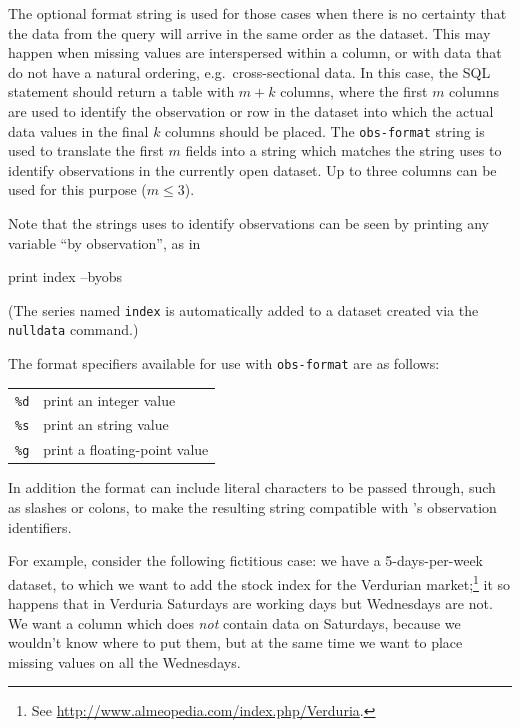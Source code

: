 The optional format string is used for those cases when there is no
certainty that the data from the query will arrive in the same order
as the  dataset. This may happen when missing values are
interspersed within a column, or with data that do not have a natural
ordering, e.g.\ cross-sectional data. In this case, the SQL statement
should return a table with $m+k$ columns, where the first $m$
columns are used to identify the observation or row in the 
dataset into which the actual data values in the final $k$ columns
should be placed.  The \texttt{obs-format} string is used to translate
the first $m$ fields into a string which matches the string
 uses to identify observations in the currently open
dataset. Up to three columns can be used for this purpose ($m \leq
3$).

Note that the strings  uses to identify observations
can be seen by printing any variable ``by observation'', as in
%
\begin{code}
print index --byobs
\end{code}
%
(The series named \texttt{index} is automatically added to a dataset
created via the \texttt{nulldata} command.)

The format specifiers available for use with \texttt{obs-format} are
as follows:

\begin{center}
\begin{tabular}{ll}
\texttt{\%d} & print an integer value \\
\texttt{\%s} & print an string value \\
\texttt{\%g} & print a floating-point value \\
\end{tabular}
\end{center}

In addition the format can include literal characters to be passed
through, such as slashes or colons, to make the resulting string
compatible with 's observation identifiers.

For example, consider the following fictitious case: we have a
5-days-per-week dataset, to which we want to add the stock index for
the Verdurian market;\footnote{See
  \url{http://www.almeopedia.com/index.php/Verduria}.} it so
happens that in Verduria Saturdays are working days but Wednesdays are
not. We want a column which does \emph{not} contain data on
Saturdays, because we wouldn't know where to put them, but at the same
time we want to place missing values on all the Wednesdays.

